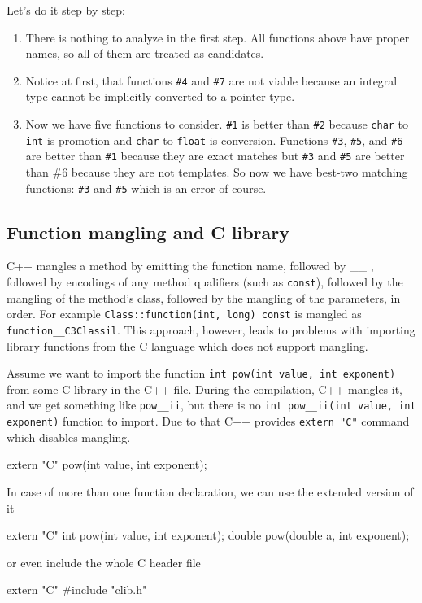 \documentclass[../main]{subfiles}
\begin{document}
Let's do it step by step:
\begin{enumerate}
    \item There is nothing to analyze in the first step. All functions above have proper names, so all of them are treated as candidates.
    \item Notice at first, that functions \texttt{\#4} and \texttt{\#7} are not viable because an integral type cannot be implicitly converted to a pointer type.
    \item Now we have five functions to consider. \texttt{\#1} is better than \texttt{\#2} because \texttt{char} to \texttt{int} is promotion and \texttt{char} to \texttt{float} is
    conversion. Functions \texttt{\#3}, \texttt{\#5}, and \texttt{\#6} are better than \texttt{\#1} because they are exact matches but
    \texttt{\#3} and \texttt{\#5} are better than \#6 because they are not templates. So now we have best-two matching functions:
    \texttt{\#3} and \texttt{\#5} which is an error of course.
\end{enumerate}

\subsection{Function mangling and C library}
    C++ mangles a method by emitting the function name, followed by \_\_ , followed by encodings of any method qualifiers (such as \texttt{const}), followed by the mangling of the method's class, followed by the
mangling of the parameters, in order. For example \texttt{Class::function(int, long) const} is mangled as \texttt{function\_\_C3Classil}. This approach, however, leads to problems with importing library functions
from the C language which does not support mangling.\newline

    Assume we want to import the function \texttt{int pow(int value, int exponent)} from some C library in the C++ file. During the compilation, C++ mangles it, and we get something like
\texttt{pow\_\_ii}, but there is no \texttt{int pow\_\_ii(int value, int exponent)} function to import. Due to that C++ provides \texttt{extern "C"} command which disables mangling.
\begin{Code}
    extern "C" pow(int value, int exponent);
\end{Code}
    In case of more than one function declaration, we can use the extended version of it
\begin{Code}
    extern "C"
    {
        int pow(int value, int exponent);
        double pow(double a, int exponent);
    }
\end{Code}
\noindent
or even include the whole C header file
\begin{Code}
    extern "C"
    {
        #include "clib.h"
    }
\end{Code}
\end{document}
